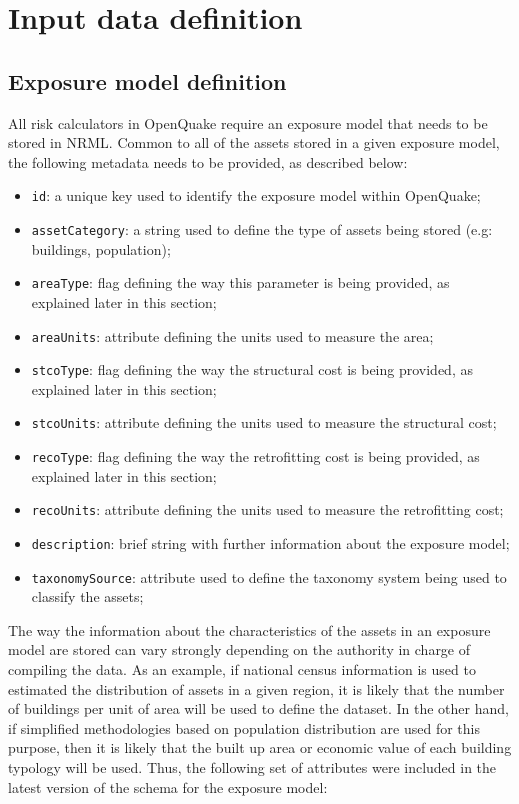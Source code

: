 \section{Input data definition}
\subsection{Exposure model definition}
All risk calculators in OpenQuake require an exposure model that needs to be stored in NRML. Common to all of the assets stored in a given exposure model, the following metadata needs to be provided, as described below: 

\begin{itemize}
\item  \Verb+id+: a unique key used to identify the exposure model within OpenQuake;
\item  \Verb+assetCategory+: a string used to define the type of assets being stored (e.g: buildings, population);
\item  \Verb+areaType+: flag defining the way this parameter is being provided, as explained later in this section; 
\item  \Verb+areaUnits+: attribute defining the units used to measure the area; 
\item  \Verb+stcoType+: flag defining the way the structural cost is being provided, as explained later in this section; 
\item  \Verb+stcoUnits+: attribute defining the units used to measure the structural cost;
\item  \Verb+recoType+: flag defining the way the retrofitting cost is being provided, as explained later in this section; 
\item  \Verb+recoUnits+: attribute defining the units used to measure the retrofitting cost;
\item  \Verb+description+: brief string with further information about the exposure model;
\item  \Verb+taxonomySource+: attribute used to define the taxonomy system being used to classify the assets;
\end{itemize}

The way the information about the characteristics of the assets in an exposure model are  stored can vary strongly depending on the authority in charge of compiling the data. As an example, if national census information is used to estimated the distribution of assets in a given region, it is likely that the number of buildings per unit of area will be used to define the dataset. In the other hand, if simplified methodologies based on population distribution are used for this purpose, then it is likely that the built up area or economic value of each building typology will be used. Thus, the following set of attributes were included in the latest version of the schema for the exposure model:

